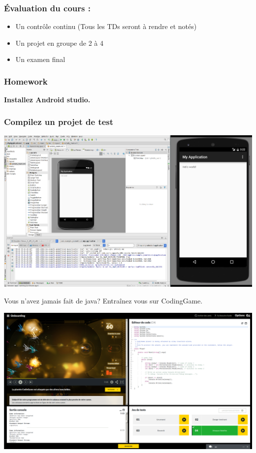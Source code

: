 \documentclass{beamer}
\begin{document}
\begin{frame}
\frametitle{Évaluation du cours :}

\begin{itemize}
	\item Un contrôle continu (Tous les TDs seront à rendre et notés)
	\item Un projet en groupe de 2 à 4
	\item Un examen final
\end{itemize}
\end{frame}

\begin{frame}
\frametitle{Homework}

\begin{center}
\textbf{Installez Android studio.}
\end{center}

\end{frame}

\begin{frame}
\frametitle{Compilez un projet de test}
\begin{center}
\includegraphics[scale=0.18]{android_test.png}
\end{center}
\end{frame}


\begin{frame}
Vous n'avez jamais fait de java? Entraînez vous sur CodingGame.

\begin{center}
\includegraphics[scale=0.18]{codinggame.png}
\end{center}
\end{frame}
\end{document}
